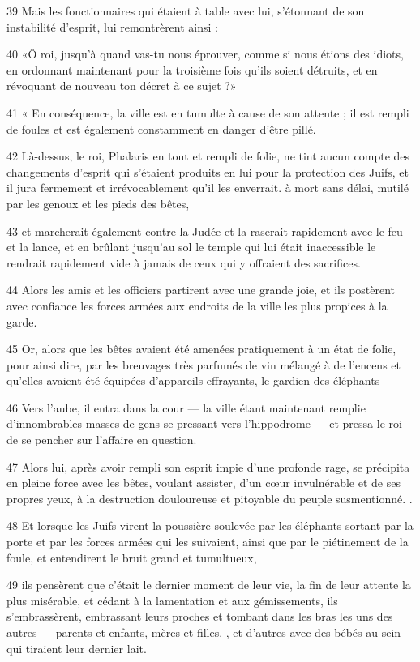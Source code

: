 \par 39 Mais les fonctionnaires qui étaient à table avec lui, s'étonnant de son instabilité d'esprit, lui remontrèrent ainsi :
\par 40 «Ô roi, jusqu'à quand vas-tu nous éprouver, comme si nous étions des idiots, en ordonnant maintenant pour la troisième fois qu'ils soient détruits, et en révoquant de nouveau ton décret à ce sujet ?»
\par 41 « En conséquence, la ville est en tumulte à cause de son attente ; il est rempli de foules et est également constamment en danger d'être pillé.
\par 42 Là-dessus, le roi, Phalaris en tout et rempli de folie, ne tint aucun compte des changements d'esprit qui s'étaient produits en lui pour la protection des Juifs, et il jura fermement et irrévocablement qu'il les enverrait. à mort sans délai, mutilé par les genoux et les pieds des bêtes,
\par 43 et marcherait également contre la Judée et la raserait rapidement avec le feu et la lance, et en brûlant jusqu'au sol le temple qui lui était inaccessible le rendrait rapidement vide à jamais de ceux qui y offraient des sacrifices.
\par 44 Alors les amis et les officiers partirent avec une grande joie, et ils postèrent avec confiance les forces armées aux endroits de la ville les plus propices à la garde.
\par 45 Or, alors que les bêtes avaient été amenées pratiquement à un état de folie, pour ainsi dire, par les breuvages très parfumés de vin mélangé à de l'encens et qu'elles avaient été équipées d'appareils effrayants, le gardien des éléphants
\par 46 Vers l'aube, il entra dans la cour — la ville étant maintenant remplie d'innombrables masses de gens se pressant vers l'hippodrome — et pressa le roi de se pencher sur l'affaire en question.
\par 47 Alors lui, après avoir rempli son esprit impie d'une profonde rage, se précipita en pleine force avec les bêtes, voulant assister, d'un cœur invulnérable et de ses propres yeux, à la destruction douloureuse et pitoyable du peuple susmentionné. .
\par 48 Et lorsque les Juifs virent la poussière soulevée par les éléphants sortant par la porte et par les forces armées qui les suivaient, ainsi que par le piétinement de la foule, et entendirent le bruit grand et tumultueux,
\par 49 ils pensèrent que c'était le dernier moment de leur vie, la fin de leur attente la plus misérable, et cédant à la lamentation et aux gémissements, ils s'embrassèrent, embrassant leurs proches et tombant dans les bras les uns des autres — parents et enfants, mères et filles. , et d'autres avec des bébés au sein qui tiraient leur dernier lait.
